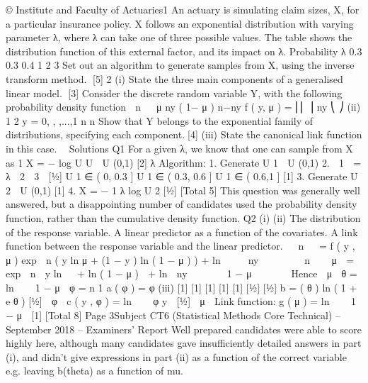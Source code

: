© Institute and Faculty of Actuaries1
An actuary is simulating claim sizes, X, for a particular insurance policy. X follows
an exponential distribution with varying parameter λ, where λ can take one of three
possible values.
The table shows the distribution function of this external factor, and its impact on λ.
Probability
λ
0.3 0.3 0.4
1 2 3
Set out an algorithm to generate samples from X, using the inverse transform method.
[5]
2
(i)
State the three main components of a generalised linear model.
[3]
Consider the discrete random variable Y, with the following probability density
function
⎛ n ⎞
⎟ μ ny ( 1− μ ) n−ny
f ( y, μ ) = ⎜⎜
⎟
ny
⎝
⎠
(ii)
1 2
y = 0, , ,...,1
n n
Show that Y belongs to the exponential family of distributions, specifying each
component.[4]
(iii)
State the canonical link function in this case.
	
Solutions
Q1
For a given λ, we know that one can sample from X as
1
X = − log U
U  U (0,1)
[2]
λ
Algorithm:
1. Generate U 1  U (0,1)
2.
 1

=
λ  2
 3

[1⁄2]
U 1 ∈ ( 0, 0.3 ]
U 1 ∈ ( 0.3, 0.6 ]
U 1 ∈ ( 0.6,1 ]
[1]
3. Generate U 2  U (0,1)
[1]
4. X = −
1
λ
log U 2
[1⁄2]
[Total 5]
This question was generally well answered, but a disappointing number of candidates used
the probability density function, rather than the cumulative density function.
Q2
(i)
(ii)
The distribution of the response variable.
A linear predictor as a function of the covariates.
A link function between the response variable and the linear predictor.

 n  
=
f ( y , μ ) exp  n ( y ln μ + (1 − y ) ln ( 1 − μ ) ) + ln   
 ny  

 

 n  
 μ 
= exp  n  y ln 
 + ln ( 1 − μ )  + ln  ny  
  
 1 − μ 
   

Hence
 μ 
θ = ln 

 1 − μ 
φ = n
1
a ( φ ) =
φ
(iii)
[1]
[1]
[1]
[1]
[1]
[1⁄2]
[1⁄2]
b =
( θ ) ln ( 1 + e θ ) [1⁄2]
 φ 
c ( y , φ ) = ln  
 φ y  [1⁄2]
 μ 
Link function: g ( μ ) = ln 

 1 − μ  [1]
[Total 8]
Page 3Subject CT6 (Statistical Methods Core Technical) – September 2018 – Examiners’ Report
Well prepared candidates were able to score highly here, although many candidates gave
insufficiently detailed answers in part (i), and didn’t give expressions in part (ii) as a function
of the correct variable e.g. leaving b(theta) as a function of mu.


